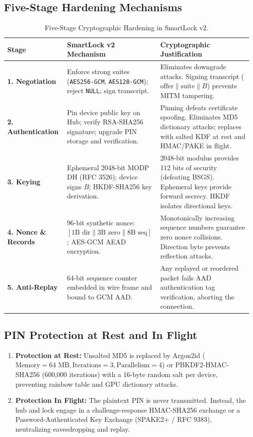 \documentclass[11pt,a4paper]{article}
\begin{document}
\subsection{Five-Stage Hardening Mechanisms}
\begin{table}[h!]
\centering
\small
\renewcommand{\arraystretch}{1.3}
\begin{tabular}{p{2.8cm}p{5.5cm}p{7.2cm}}
\toprule
\textbf{Stage} & \textbf{SmartLock v2 Mechanism} & \textbf{Cryptographic Justification} \\
\midrule
\textbf{1. Negotiation} & Enforce strong suites (\texttt{AES256-GCM}, \texttt{AES128-GCM}); reject \texttt{NULL}; sign transcript. & Eliminates downgrade attacks. Signing transcript ($\text{offer} \parallel \text{suite} \parallel B$) prevents MITM tampering. \\
\textbf{2. Authentication} & Pin device public key on Hub; verify RSA-SHA256 signature; upgrade PIN storage and verification. & Pinning defeats certificate spoofing. Eliminates MD5 dictionary attacks; replaces with salted KDF at rest and HMAC/PAKE in flight. \\
\textbf{3. Keying} & Ephemeral 2048-bit MODP DH (RFC 3526); device signs $B$; HKDF-SHA256 key derivation. & 2048-bit modulus provides 112 bits of security (defeating BSGS). Ephemeral keys provide forward secrecy. HKDF isolates directional keys. \\
\textbf{4. Nonce \& Records} & 96-bit synthetic nonce: $[1\text{B dir} \parallel 3\text{B zero} \parallel 8\text{B seq}]$; AES-GCM AEAD encryption. & Monotonically increasing sequence numbers guarantee zero nonce collisions. Direction byte prevents reflection attacks. \\
\textbf{5. Anti-Replay} & 64-bit sequence counter embedded in wire frame and bound to GCM AAD. & Any replayed or reordered packet fails AAD authentication tag verification, aborting the connection. \\
\bottomrule
\end{tabular}
\caption{Five-Stage Cryptographic Hardening in SmartLock v2.}
\end{table}

\subsection{PIN Protection at Rest and In Flight}
\begin{enumerate}
    \item \textbf{Protection at Rest:} Unsalted MD5 is replaced by Argon2id ($\text{Memory}=64\text{ MB}, \text{Iterations}=3, \text{Parallelism}=4$) or PBKDF2-HMAC-SHA256 (600,000 iterations) with a 16-byte random salt per device, preventing rainbow table and GPU dictionary attacks.
    \item \textbf{Protection In Flight:} The plaintext PIN is never transmitted. Instead, the hub and lock engage in a challenge-response HMAC-SHA256 exchange or a Password-Authenticated Key Exchange (SPAKE2+ / RFC 9383), neutralizing eavesdropping and replay.
\end{enumerate}
\end{document}
